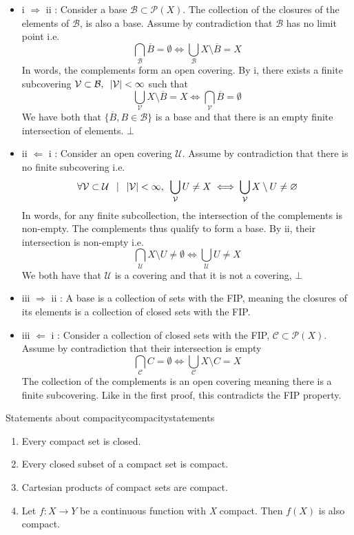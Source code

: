 \begin{myproof}
	\begin{itemize}
		\item i $\Rightarrow$ ii : Consider a base $\mathcal{B} \subset \mathcal{P}(X)$. \enskip The collection of the closures of the elements of $\mathcal{B}$, is also a base. \enskip Assume by contradiction that $\mathcal{B}$ has no limit point i.e.
		$$\bigcap_{\mathcal{B}} \overline{B} = \emptyset \iff \bigcup_{\mathcal{B}} X \setminus \overline{B} = X$$
		In words, the complements form an open covering. By i, there exists a finite subcovering $\mathcal{V}\subset \mathcal{B}, \enskip |\mathcal{V}| < \infty$ such that
		$$\bigcup_{ \mathcal{V}} X \setminus \overline{B} = X \iff \bigcap_{ \mathcal{V}} \overline{B} = \emptyset{} $$
		We have both that $\{\overline{B}, B \in \mathcal{B}\}$ is a base and that there is an empty finite intersection of elements. $\bot$

		\item ii $\Leftarrow$ i  : Consider an open covering $\mathcal{U}$. Assume by contradiction that there is no finite subcovering i.e.
			$$\forall \mathcal{V} \subset \mathcal{U} \enspace \mid \enspace  |\mathcal{V}| < \infty, \enskip \bigcup_{ \mathcal{V}} U \neq X \iff \bigcup_{ \mathcal{V}} X \setminus U \neq \emptyset{}$$
		In words, for any finite subcollection, the intersection of the complements is non-empty. The complements thus qualify to form a base. By ii, their intersection is non-empty i.e.
		$$\bigcap_{ \mathcal{U}} X \setminus U \neq \emptyset{} \iff \bigcup_{ \mathcal{U}} U \neq X$$
		We both have that $\mathcal{U}$ is a covering and that it is not a covering, $\bot$
		\item iii $\Rightarrow$ ii : A base is a collection of sets with the FIP, meaning the closures of its elements is a collection of closed sets with the FIP.
		\item iii $\Leftarrow$ i : Consider a collection of closed sets with the FIP, $\mathcal{C} \subset \mathcal{P}(X)$. Assume by contradiction that their intersection is empty
		$$\bigcap_{ \mathcal{C}} C = \emptyset{} \iff \bigcup_{ \mathcal{C}} X \setminus C = X$$
		The collection of the complements is an open covering meaning there is a finite subcovering. Like in the first proof, this contradicts the FIP property.
	\end{itemize}
\end{myproof}
\begin{myprop}{Statements about compacity}{compacitystatements}
	\begin{enumerate}[label = \roman*.]
		\item Every compact set is closed.
		\item Every closed subset of a compact set is compact.
		\item Cartesian products of compact sets are compact.
		\item Let $f : X \to Y$ be a continuous function with \textit{X} compact. Then $f(X)$ is also compact.
	\end{enumerate}
\end{myprop}
